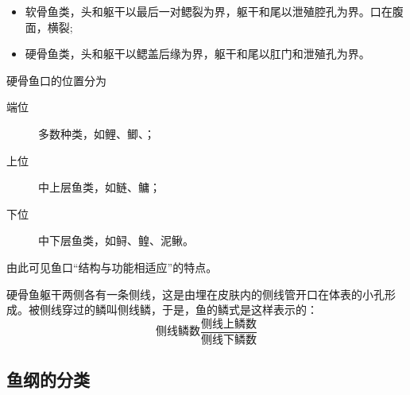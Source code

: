 \begin{itemize}
	\item 软骨鱼类，头和躯干以最后一对鳃裂为界，躯干和尾以泄殖腔孔为界。口在腹面，横裂;
	\item 硬骨鱼类，头和躯干以鳃盖后缘为界，躯干和尾以肛门和泄殖孔为界。
\end{itemize}

硬骨鱼口的位置分为
\begin{description}
	\item[端位] 多数种类，如鲤、鲫、；
	\item[上位] 中上层鱼类，如鲢、鳙；
	\item[下位] 中下层鱼类，如鲟、鳇、泥鳅。
\end{description}
由此可见鱼口“结构与功能相适应”的特点。

硬骨鱼躯干两侧各有一条侧线，这是由埋在皮肤内的侧线管开口在体表的小孔形成。被侧线穿过的鳞叫侧线鳞，于是，鱼的鳞式是这样表示的：
\[\text{侧线鳞数}\frac{\text{侧线上鳞数}}{\text{侧线下鳞数}}\]


\subsection{鱼纲的分类}
